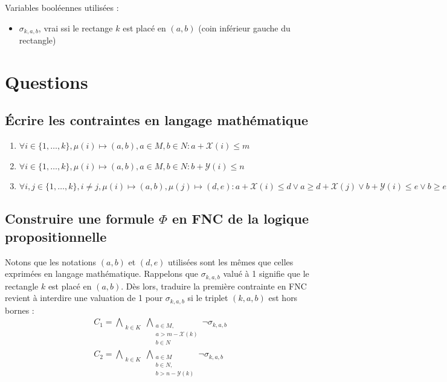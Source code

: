 \documentclass[a4paper]{article}
\begin{document}
Variables booléennes utilisées :
\begin{itemize}
	\item $\sigma_{k,a,b}$, vrai ssi le rectange $k$ est placé en $(a,b)$ (coin inférieur gauche du rectangle)
	
\end{itemize}
\section{Questions}
\subsection{Écrire les contraintes en langage mathématique}
\begin{enumerate}
	\item $\forall i \in \{1,\dots, k\}, \mu(i) \mapsto (a,b), a\in M, b\in N : a+\mathcal{X}(i) \leq m $
	\item $\forall i \in \{1,\dots, k\}, \mu(i) \mapsto (a,b), a\in M, b\in N : b+\mathcal{Y}(i) \leq n $
	\item $\forall i, j \in \{1,\dots, k\},  i \neq j, \mu(i) \mapsto (a, b),  \mu(j) \mapsto (d,e) :  a + \mathcal{X}(i) \leq d \lor a \geq d +\mathcal{X}(j) \lor b + \mathcal{Y}(i) \leq e \lor b \geq e + \mathcal{Y}(j) $
\end{enumerate}

\newpage
\subsection{Construire une formule $\Phi$ en FNC de la logique propositionnelle}
Notons que les notations $(a, b)$ et $(d, e)$ utilisées sont les mêmes que celles exprimées en langage mathématique.
Rappelons que $\sigma_{k,a,b}$ valué à 1 signifie que le rectangle $k$ est placé en $(a,b)$. Dès lors, traduire la première contrainte en FNC revient à interdire une valuation de 1 pour $\sigma_{k,a,b}$ si le triplet $(k, a, b)$ est hors bornes :
\begin{equation*}
\begin{split}
	&C_1 = \bigwedge\limits_{\substack{k\in K}} \bigwedge\limits_{\substack{a \in M, \\ a > m - \mathcal{X}(k) \\ b\in N}} \lnot \sigma_{k,a, b}\\
    &C_2 = \bigwedge\limits_{\substack{k\in K}} \bigwedge\limits_{\substack{a \in M \\ b \in N,\\ b > n - \mathcal{Y}(k)}} \lnot \sigma_{k,a, b}
\end{split}
\end{equation*}
\end{document}
